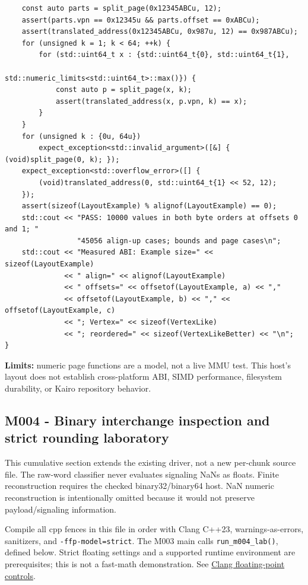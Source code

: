 \begin{verbatim}
    const auto parts = split_page(0x12345ABCu, 12);
    assert(parts.vpn == 0x12345u && parts.offset == 0xABCu);
    assert(translated_address(0x12345ABCu, 0x987u, 12) == 0x987ABCu);
    for (unsigned k = 1; k < 64; ++k) {
        for (std::uint64_t x : {std::uint64_t{0}, std::uint64_t{1},
                                std::numeric_limits<std::uint64_t>::max()}) {
            const auto p = split_page(x, k);
            assert(translated_address(x, p.vpn, k) == x);
        }
    }
    for (unsigned k : {0u, 64u})
        expect_exception<std::invalid_argument>([&] { (void)split_page(0, k); });
    expect_exception<std::overflow_error>([] {
        (void)translated_address(0, std::uint64_t{1} << 52, 12);
    });
    assert(sizeof(LayoutExample) % alignof(LayoutExample) == 0);
    std::cout << "PASS: 10000 values in both byte orders at offsets 0 and 1; "
                 "45056 align-up cases; bounds and page cases\n";
    std::cout << "Measured ABI: Example size=" << sizeof(LayoutExample)
              << " align=" << alignof(LayoutExample)
              << " offsets=" << offsetof(LayoutExample, a) << ","
              << offsetof(LayoutExample, b) << "," << offsetof(LayoutExample, c)
              << "; Vertex=" << sizeof(VertexLike)
              << "; reordered=" << sizeof(VertexLikeBetter) << "\n";
}
\end{verbatim}

\textbf{Limits:} numeric page functions are a model, not a live MMU test. This host's layout does not establish cross-platform ABI, SIMD performance, filesystem durability, or Kairo repository behavior.

\subsection{M004 - Binary interchange inspection and strict rounding laboratory}\label{appendix-4e2236f53445-m004---binary-interchange-inspection-and-strict-rounding-laboratory}

This cumulative section extends the existing driver, not a new per-chunk source file. The raw-word classifier never evaluates signaling NaNs as floats. Finite reconstruction requires the checked binary32/binary64 host. NaN numeric reconstruction is intentionally omitted because it would not preserve payload/signaling information.

Compile all cpp fences in this file in order with Clang C++23, warnings-as-errors, sanitizers, and \texttt{-ffp-model=strict}. The M003 main calls \texttt{run\_m004\_lab()}, defined below. Strict floating settings and a supported runtime environment are prerequisites; this is not a fast-math demonstration. See \href{https://clang.llvm.org/docs/UsersManual.html\#controlling-floating-point-behavior}{Clang floating-point controls}.

